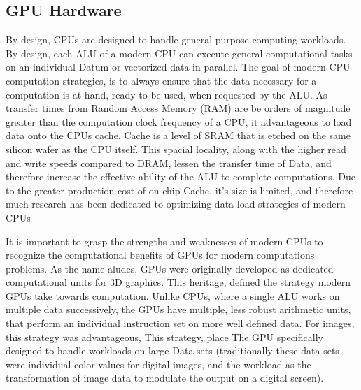 \subsection{GPU Hardware}
By design, \Glspl{CPU} are designed
to handle general purpose computing workloads.
By design, each \Gls{ALU} of a modern CPU can execute general computational
tasks on an individual Datum or vectorized data in parallel.
The goal of modern CPU computation strategies, is to always ensure that the data
necessary for a computation is at hand, ready to be used, when requested by the ALU.
As transfer times from Random Access Memory
(RAM) are be orders of magnitude greater than the computation clock frequency of
a CPU, it advantageous to load data onto the CPUs cache. Cache is a level of
\Gls{SRAM}
that is etched on the same silicon wafer as the CPU itself.  This spacial locality,
along with the higher read and write speeds compared to DRAM, lessen the transfer
time of Data, and therefore increase the effective ability of the ALU to complete computations.
Due to the greater production cost of on-chip Cache, it's size is limited, and therefore
much research has been dedicated to optimizing data load strategies of modern CPUs
\par

It is important to grasp the strengths and weaknesses of modern \Glspl{CPU} to
recognize the computational benefits of \Glspl{GPU}
for modern computations problems.  As the name aludes, GPUs were originally developed
as dedicated computational units for 3D graphics\cite{Sanders}.  This heritage,
defined the strategy modern GPUs take towards computation.  Unlike CPUs, where a
single ALU works on multiple data successively, the GPUs have multiple, less robust
arithmetic units, that perform an individual instruction set on more well defined data.
For images, this strategy was advantageous,
This strategy, place
The GPU specifically designed to handle workloads on large Data sets (traditionally these
data sets were individual color values for digital images, and the workload as
the transformation of image data to modulate the output on a digital screen).
